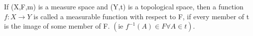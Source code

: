 If (X,F,m) is a measure space and (Y,t) is a 
topological space, then a function $ f:X \rightarrow Y $
is called a measurable function with respect to F, if
every member of t is the image of some member of F.
$ ( \text{ie } f^{-1}(A) \in F \forall A \in t ). $
